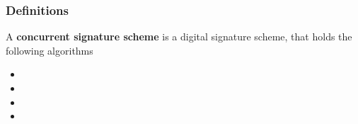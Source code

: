 \begin{frame}
	\frametitle{Definitions}

	\begin{definition}
		A \textbf{concurrent signature scheme} is a digital signature scheme, that holds the following algorithms
		\begin{itemize}
			\item \setup
			\item \asign
			\item \averify
			\item \verify
		\end{itemize}
	\end{definition}
\end{frame}
